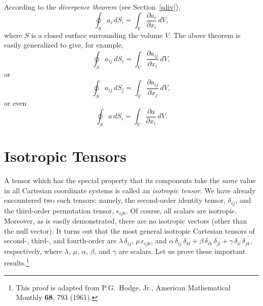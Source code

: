 According to the {\em divergence theorem}\/ (see Section~\ref{sdiv}),
\begin{equation}
\oint_S a_i\,dS_i = \int_V \frac{\partial a_i}{\partial x_i}\,dV,
\end{equation}
where $S$ is a closed surface surrounding the volume $V$. The above theorem is
easily generalized to give, for example, 
\begin{equation}
\oint_S a_{ij}\,dS_i = \int_V \frac{\partial a_{ij}}{\partial x_i}\,dV,
\end{equation}
or
\begin{equation}
\oint_S a_{ij}\,dS_j = \int_V \frac{\partial a_{ij}}{\partial x_j}\,dV,
\end{equation}
or even
\begin{equation}
\oint_S a\,dS_i = \int_V \frac{\partial a}{\partial x_i}\,dV.
\end{equation}

\section{Isotropic Tensors}\label{siso}
A tensor which has the special property that its components take the {\em same}\/ value in all
Cartesian coordinate systems is called an {\em isotropic tensor}. We have already encountered two
such tensors: namely, the second-order identity tensor, $\delta_{ij}$, and the third-order
permutation tensor, $\epsilon_{ijk}$. Of course, all scalars are isotropic. Moreover, as is easily
demonstrated, there are
no isotropic vectors (other than the null vector). 
It turns out that the
most general isotropic Cartesian tensors of second-, third-, and fourth-order are $\lambda\,\delta_{ij}$, $\mu\,\epsilon_{ijk}$,
and $\alpha\,\delta_{ij}\,\delta_{kl} + \beta\,\delta_{ik}\,\delta_{jl} + \gamma\,\delta_{il}\,\delta_{jk}$, respectively,
where $\lambda$, $\mu$, $\alpha$, $\beta$, and $\gamma$ are scalars. Let us prove these important results.\footnote{This proof
is adapted from P.G.~Hodge, Jr., American Mathematical Monthly {\bf 68}, 793 (1961).} 

